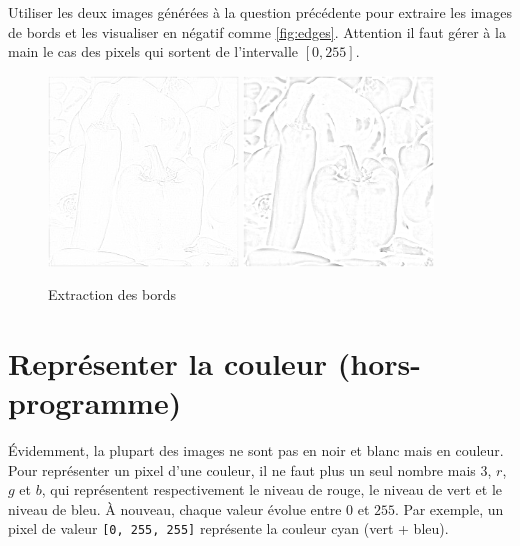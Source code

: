 \ques Utiliser les deux images générées à la question précédente pour extraire les images de bords et les visualiser en négatif comme \autoref{fig:edges}. Attention il faut gérer à la main le cas des pixels qui sortent de l'intervalle $ [0, 255] $.

\begin{figure}[h!]
    \begin{center}
        \includegraphics[width=0.45\textwidth]{figures/11/fine-edge-poivrons.png}
        \includegraphics[width=0.45\textwidth]{figures/11/coarse-edge-poivrons.png}
    \end{center}
    \caption{Extraction des bords}
    \label{fig:edges}
\end{figure}


\section*{Représenter la couleur (hors-programme)}

Évidemment, la plupart des images ne sont pas en noir et blanc mais en couleur. Pour représenter un pixel d'une couleur, il ne faut plus un seul nombre mais 3, $ r $, $ g $ et $ b $, qui représentent respectivement le niveau de rouge, le niveau de vert et le niveau de bleu. À nouveau, chaque valeur évolue entre $ 0 $ et $ 255 $. Par exemple, un pixel de valeur \texttt{[0, 255, 255]} représente la couleur cyan (vert + bleu).

